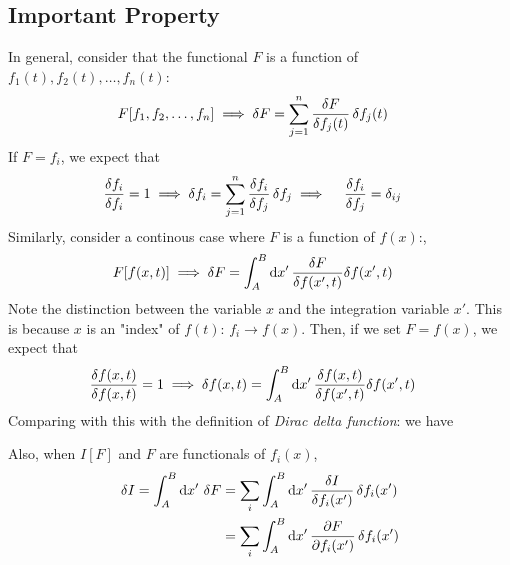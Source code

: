 \subsection{Important Property}
In general, consider that the functional $F$ is a function of $f_1(t), f_2(t), \ldots, f_n(t)$:
\begin{align}
  F[f_1, f_2, \ldots, f_n] \implies \fdif{F} & = \sum_{j=1}^{n} \fdv{F}{f_j(t)} \fdif{f_j(t)}
\end{align}
If $F = f_i$, we expect that
\begin{align}
  \fdv{f_i}{f_i} & = 1 \implies \fdif{f_i} = \sum_{j=1}^{n} \fdv{f_i}{f_j} \fdif{f_j}
  \implies \quad \fdv{f_i}{f_j} = \delta_{ij} \label{eq:func_deriv_kronecker_delta}
\end{align}
Similarly, consider a continous case where $F$ is a function of $f(x)$:,
\begin{align}
  F[f(x,t)] \implies \fdif{F} & = \int_A^B \odif{x'} \, \fdv{F}{f(x',t)} \delta{f(x',t)}
\end{align}
Note the distinction between the variable $x$ and the integration variable $x'$. This is because $x$ is an "index" of $f(t)$: $f_i \to f(x)$.
Then, if we set $F = f(x)$, we expect that
\begin{align}
  \fdv{f(x, t)}{f(x, t)} & = 1 \implies \delta{f(x, t)} = \int_A^B \odif{x'} \, \fdv{f(x,t)}{f(x',t)} \delta{f(x',t)}
\end{align}
Comparing with this with the definition of \emph{Dirac delta function}:
we have

Also, when $I[F]$ and $F$ are functionals of $f_i(x)$,
\begin{align}
  \fdif{I} = \int_A^B \odif{x'} \, \fdif{F}
   & = \sum_i \int_A^B \odif{x'} \, \fdv{I}{f_i(x')} \fdif{f_i(x')} \\
   & = \sum_i \int_A^B \odif{x'} \, \pdv{F}{f_i(x')} \fdif{f_i(x')}
\end{align}

\cite{eman-functionalDerivative}